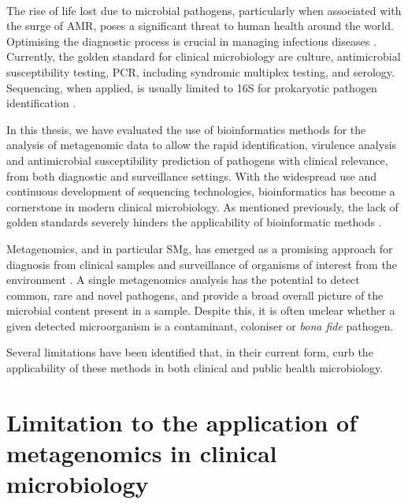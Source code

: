 \renewcommand*{\thefootnote}{\arabic{footnote}}

\mbox{}\\
\vspace{8cm}

The rise of life lost due to microbial pathogens, particularly when associated with the surge of \ac{AMR}, poses a significant threat to human health around the world. Optimising the diagnostic process is crucial in managing infectious diseases \citep{vos_global_2020}. Currently, the golden standard for clinical microbiology are culture, antimicrobial susceptibility testing, \ac{PCR}, including syndromic multiplex testing, and serology. Sequencing, when applied, is usually limited to 16S for prokaryotic pathogen identification \citep{greninger_challenge_2018}. 

In this thesis, we have evaluated the use of bioinformatics methods for the analysis of metagenomic data to allow the rapid identification, virulence analysis and antimicrobial susceptibility prediction of pathogens with clinical relevance, from both diagnostic and surveillance settings. With the widespread use and continuous development of sequencing technologies, bioinformatics has become a cornerstone in modern clinical microbiology. As mentioned previously, the lack of golden standards severely hinders the applicability of bioinformatic methods \citep{carrico_primer_2018, couto_critical_2018, angers-loustau_challenges_2018, gruening_recommendations_2019, sczyrba_critical_2017}. 

Metagenomics, and in particular \ac{SMg}, has emerged as a promising approach for diagnosis from clinical samples and surveillance of organisms of interest from the environment \citep{loman_culture-independent_2013, rossen__2018, schuele_future_2021, chiu_clinical_2019}. A single metagenomics analysis has the potential to detect common, rare and novel pathogens, and provide a broad overall picture of the microbial content present in a sample. Despite this, it is often unclear whether a given detected microorganism is a contaminant, coloniser or \textit{bona fide} pathogen. 

Several limitations have been identified that, in their current form, curb the applicability of these methods in both clinical and public health microbiology. 

\section{Limitation to the application of metagenomics in clinical microbiology}

